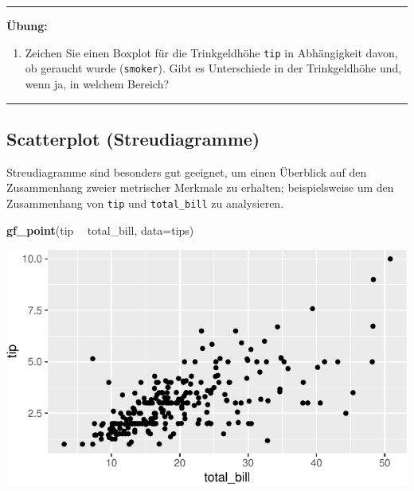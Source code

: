 \documentclass[12pt,ngerman,paper=a4,pagesize,DIV=13]{scrreprt}
\newenvironment{Shaded}{\begin{snugshade}}{\end{snugshade}}
\newcommand{\DataTypeTok}[1]{\textcolor[rgb]{0.13,0.29,0.53}{#1}}
\newcommand{\KeywordTok}[1]{\textcolor[rgb]{0.13,0.29,0.53}{\textbf{#1}}}
\newcommand{\NormalTok}[1]{#1}
\newcommand{\OperatorTok}[1]{\textcolor[rgb]{0.81,0.36,0.00}{\textbf{#1}}}
\newcommand{\StringTok}[1]{\textcolor[rgb]{0.31,0.60,0.02}{#1}}
\providecommand{\tightlist}{%
  \setlength{\itemsep}{0pt}\setlength{\parskip}{0pt}}
\begin{document}
\begin{center}\rule{0.5\linewidth}{\linethickness}\end{center}

\textbf{Übung:}

\begin{enumerate}
\def\labelenumi{\arabic{enumi}.}
\setcounter{enumi}{2}
\tightlist
\item
  Zeichen Sie einen Boxplot für die Trinkgeldhöhe \texttt{tip} in
  Abhängigkeit davon, ob geraucht wurde (\texttt{smoker}). Gibt es
  Unterschiede in der Trinkgeldhöhe und, wenn ja, in welchem Bereich?
\end{enumerate}

\begin{center}\rule{0.5\linewidth}{\linethickness}\end{center}

\hypertarget{scatterplot-streudiagramme}{%
\subsection{Scatterplot
(Streudiagramme)}\label{scatterplot-streudiagramme}}

Streudiagramme sind besonders gut geeignet, um einen Überblick auf den
Zusammenhang zweier metrischer Merkmale zu erhalten; beispielsweise um
den Zusammenhang von \texttt{tip} und \texttt{total\_bill} zu
analysieren.

\begin{Shaded}
\begin{Highlighting}[]
\KeywordTok{gf_point}\NormalTok{(tip }\OperatorTok{~}\StringTok{ }\NormalTok{total_bill, }\DataTypeTok{data=}\NormalTok{tips)}
\end{Highlighting}
\end{Shaded}

\includegraphics{DatenerhebungStatistik-Uebung_files/figure-latex/unnamed-chunk-48-1.pdf}
\end{document}
